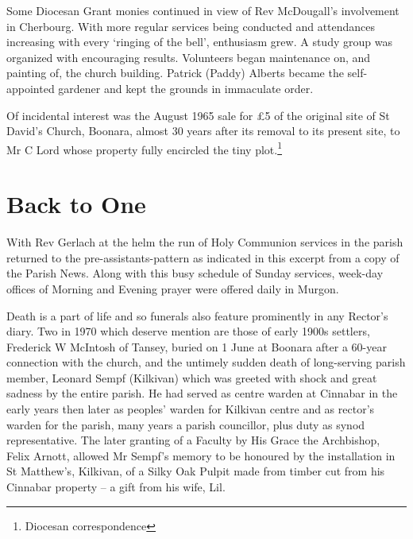 Some Diocesan Grant monies continued in view of Rev McDougall's involvement in Cherbourg. With more regular services being conducted and attendances increasing with every `ringing of the bell', enthusiasm grew. A study group was organized with encouraging results. Volunteers began maintenance on, and painting of, the church building. Patrick (Paddy) Alberts became the self-appointed gardener and kept the grounds in immaculate order.



Of incidental interest was the August 1965 sale for \pounds5 of the original site of St David's Church, Boonara, almost 30 years after its removal to its present site, to Mr C Lord whose property fully encircled the tiny plot.\footnote{Diocesan correspondence}


\section{Back to One}



With Rev Gerlach at the helm the run of Holy Communion services in the parish returned to the pre-assistants-pattern as indicated in this excerpt from a copy of the Parish News. Along with this busy schedule of Sunday services, week-day offices of Morning and Evening prayer were offered daily in Murgon.



Death is a part of life and so funerals also feature prominently in any Rector's diary. Two in 1970 which deserve mention are those of early 1900s settlers, Frederick W McIntosh of Tansey, buried on 1 June at Boonara after a 60-year connection with the church, and the untimely sudden death of long-serving parish member, Leonard Sempf (Kilkivan) which was greeted with shock and great sadness by the entire parish. He had served as centre warden at Cinnabar in the early years then later as peoples' warden for Kilkivan centre and as rector's warden for the parish, many years a parish councillor, plus duty as synod representative. The later granting of a Faculty by His Grace the Archbishop, Felix Arnott, allowed Mr Sempf's memory to be honoured by the installation in St Matthew's, Kilkivan, of a Silky Oak Pulpit made from timber cut from his Cinnabar property -- a gift from his wife, Lil.



